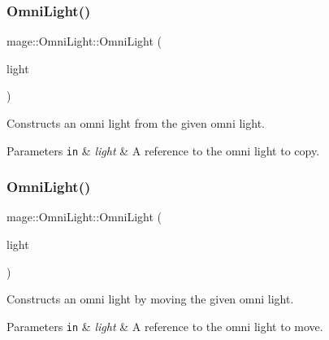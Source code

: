 \subsubsection{\texorpdfstring{Omni\+Light()}{OmniLight()}\hspace{0.1cm}{\footnotesize\ttfamily [2/3]}}
{\footnotesize\ttfamily mage\+::\+Omni\+Light\+::\+Omni\+Light (\begin{DoxyParamCaption}\item[{const \hyperlink{classmage_1_1_omni_light}{Omni\+Light} \&}]{light }\end{DoxyParamCaption})\hspace{0.3cm}{\ttfamily [default]}}

Constructs an omni light from the given omni light.


\begin{DoxyParams}[1]{Parameters}
\mbox{\tt in}  & {\em light} & A reference to the omni light to copy. \\
\hline
\end{DoxyParams}
\hypertarget{classmage_1_1_omni_light_ae0353cedc67d88be2f4b88374482933d}{}\label{classmage_1_1_omni_light_ae0353cedc67d88be2f4b88374482933d} 
\subsubsection{\texorpdfstring{Omni\+Light()}{OmniLight()}\hspace{0.1cm}{\footnotesize\ttfamily [3/3]}}
{\footnotesize\ttfamily mage\+::\+Omni\+Light\+::\+Omni\+Light (\begin{DoxyParamCaption}\item[{\hyperlink{classmage_1_1_omni_light}{Omni\+Light} \&\&}]{light }\end{DoxyParamCaption})\hspace{0.3cm}{\ttfamily [default]}}

Constructs an omni light by moving the given omni light.


\begin{DoxyParams}[1]{Parameters}
\mbox{\tt in}  & {\em light} & A reference to the omni light to move. \\
\hline
\end{DoxyParams}
\hypertarget{classmage_1_1_omni_light_af6f4921499b430041966f38aac920b69}{}\label{classmage_1_1_omni_light_af6f4921499b430041966f38aac920b69} 
